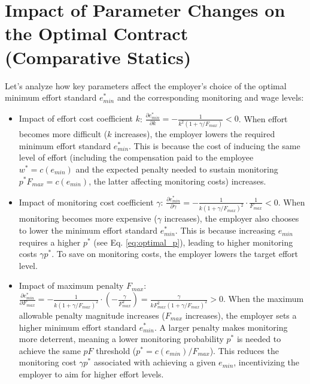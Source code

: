 \section{Impact of Parameter Changes on the Optimal Contract (Comparative Statics)}
\label{sec:comparative_statics}

Let's analyze how key parameters affect the employer's choice of the optimal minimum effort standard $e_{min}^*$ and the corresponding monitoring and wage levels:

\begin{itemize}
    \item {Impact of effort cost coefficient $k$}:
      $\frac{\partial e_{min}^*}{\partial k} = -\frac{1}{k^2 (1 + \gamma/F_{max})} < 0$.
      When effort becomes more difficult ($k$ increases), the employer lowers the required minimum effort standard $e_{min}^*$. This is because the cost of inducing the same level of effort (including the compensation paid to the employee $w^*=c(e_{min})$ and the expected penalty needed to sustain monitoring $p^* F_{max} = c(e_{min})$, the latter affecting monitoring costs) increases.

    \item {Impact of monitoring cost coefficient $\gamma$}:
      $\frac{\partial e_{min}^*}{\partial \gamma} = -\frac{1}{k (1 + \gamma/F_{max})^2} \cdot \frac{1}{F_{max}} < 0$.
      When monitoring becomes more expensive ($\gamma$ increases), the employer also chooses to lower the minimum effort standard $e_{min}^*$. This is because increasing $e_{min}$ requires a higher $p^*$ (see Eq. \ref{eq:optimal_p}), leading to higher monitoring costs $\gamma p^*$. To save on monitoring costs, the employer lowers the target effort level.

    \item {Impact of maximum penalty $F_{max}$}:
      $\frac{\partial e_{min}^*}{\partial F_{max}} = -\frac{1}{k (1 + \gamma/F_{max})^2} \cdot (-\frac{\gamma}{F_{max}^2}) = \frac{\gamma}{k F_{max}^2 (1 + \gamma/F_{max})^2} > 0$.
      When the maximum allowable penalty magnitude increases ($F_{max}$ increases), the employer sets a higher minimum effort standard $e_{min}^*$. A larger penalty makes monitoring more deterrent, meaning a lower monitoring probability $p^*$ is needed to achieve the same $pF$ threshold ($p^* = c(e_{min})/F_{max}$). This reduces the monitoring cost $\gamma p^*$ associated with achieving a given $e_{min}$, incentivizing the employer to aim for higher effort levels.
\end{itemize}

